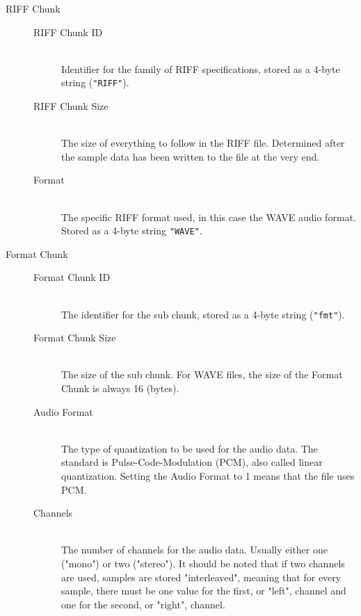 \begin{description}

  \item[RIFF Chunk] \hfill

  \begin{description}

    \item[RIFF Chunk ID] \hfill \\ Identifier for the family of RIFF specifications, stored as a 4-byte string (\texttt{"RIFF"}).

    \item[RIFF Chunk Size] \hfill \\ The size of everything to follow in the RIFF file. Determined after the sample data has been written to the file at the very end.

    \item[Format] \hfill \\ The specific RIFF format used, in this case the WAVE audio format. Stored as a 4-byte string \texttt{"WAVE"}.

  \end{description}

  \item[Format Chunk] \hfill

  \begin{description}

    \item[Format Chunk ID] \hfill \\ The identifier for the sub chunk, stored as a 4-byte string (\texttt{"fmt"}).

    \item[Format Chunk Size] \hfill \\ The size of the sub chunk. For WAVE files, the size of the Format Chunk is always 16 (bytes).

    \item[Audio Format] \hfill \\ The type of quantization to be used for the audio data. The standard is Pulse-Code-Modulation (PCM), also called linear quantization. Setting the Audio Format to 1 means that the file uses PCM.

    \item[Channels] \hfill \\ The number of channels for the audio data. Usually either one ("mono") or two ("stereo"). It should be noted that if two channels are used, samples are stored "interleaved", meaning that for every sample, there must be one value for the first, or "left", channel and one for the second, or "right", channel.


\end{description}
\end{description}
